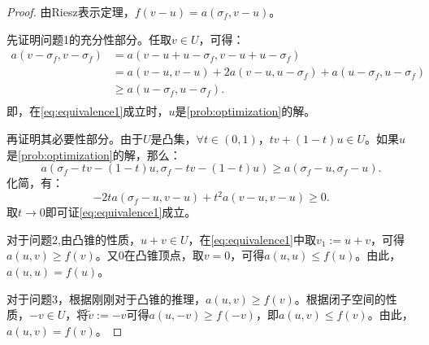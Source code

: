 \begin{proof}
  由Riesz表示定理，$f(v-u)=a(\sigma_{f},v-u)$。

  先证明问题1的充分性部分。任取$v\in U$，可得：
  \begin{equation}
    \begin{aligned}
      a(v-\sigma_{f},v-\sigma_{f})&=a(v-u+u-\sigma_{f},v-u+u-\sigma_{f})\\
      &=a(v-u,v-u)+2a(v-u,u-\sigma_{f})+a(u-\sigma_{f},u-\sigma_{f})\\
      &\ge a(u-\sigma_{f},u-\sigma_{f}).\\
    \end{aligned}
  \end{equation}
  即，在\eqref{eq:equivalence1}成立时，$u$是\ref{prob:optimization}的解。

  再证明其必要性部分。由于$U$是凸集，$\forall t\in(0,1)$，$tv+(1-t)u\in U$。如果$u$是\ref{prob:optimization}的解，那么：
  \begin{equation}
    a(\sigma_{f}-tv-(1-t)u,\sigma_{f}-tv-(1-t)u)\ge a(\sigma_{f}-u,\sigma_{f}-u).
  \end{equation}
  化简，有：
  \begin{equation}
    -2ta(\sigma_{f}-u,v-u)+t^2a(v-u,v-u)\ge 0.
  \end{equation}
  取$t\rightarrow 0$即可证\eqref{eq:equivalence1}成立。

  对于问题2,由凸锥的性质，$u+v\in U$，在\eqref{eq:equivalence1}中取$v_{1}:=u+v$，可得$a(u,v)\ge f(v)$。又$0$在凸锥顶点，取$v=0$，可得$a(u,u)\le f(u)$。由此，$a(u,u)=f(u)$。

  对于问题3，根据刚刚对于凸锥的推理，$a(u,v)\ge f(v)$。根据闭子空间的性质，$-v\in U$，将$\tilde{v}:=-v$可得$a(u,-v)\ge f(-v)$，即$a(u,v)\le f(v)$。由此，$a(u,v)=f(v)$。
\end{proof}
